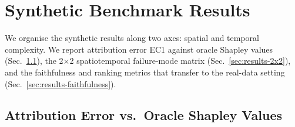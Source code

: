 \section{Synthetic Benchmark Results}
\label{sec:results-synth}

We organise the synthetic results along two axes: spatial and temporal
complexity.  We report attribution error EC1 against oracle Shapley values
(Sec.~\ref{sec:results-error}), the 2$\times$2 spatiotemporal failure-mode
matrix (Sec.~\ref{sec:results-2x2}), and the faithfulness and ranking
metrics that transfer to the real-data setting
(Sec.~\ref{sec:results-faithfulness}).

\subsection{Attribution Error vs.\ Oracle Shapley Values}
\label{sec:results-error}

